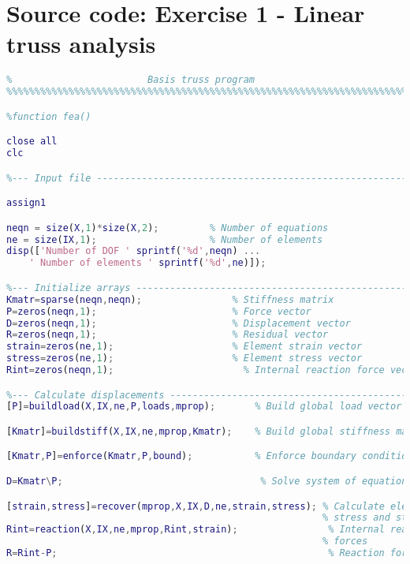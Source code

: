 

\chapter{Source code: Exercise 1 - Linear truss analysis}
\vspace{2mm}
\begin{lstlisting}[language=Matlab, caption = FE implementation for Linear truss analysis, label=lst:CodeLinear]
%%%%%%%%%%%%%%%%%%%%%%%%%%%%%%%%%%%%%%%%%%%%%%%%%%%%%%%%%%%%%%%%%%%%%%%%%%%
%                        Basis truss program                              %
%%%%%%%%%%%%%%%%%%%%%%%%%%%%%%%%%%%%%%%%%%%%%%%%%%%%%%%%%%%%%%%%%%%%%%%%%%%

%function fea()

close all
clc

%--- Input file ----------------------------------------------------------%

assign1

neqn = size(X,1)*size(X,2);         % Number of equations
ne = size(IX,1);                    % Number of elements
disp(['Number of DOF ' sprintf('%d',neqn) ...
    ' Number of elements ' sprintf('%d',ne)]);

%--- Initialize arrays ---------------------------------------------------%
Kmatr=sparse(neqn,neqn);                % Stiffness matrix
P=zeros(neqn,1);                        % Force vector
D=zeros(neqn,1);                        % Displacement vector
R=zeros(neqn,1);                        % Residual vector
strain=zeros(ne,1);                     % Element strain vector
stress=zeros(ne,1);                     % Element stress vector
Rint=zeros(neqn,1);                       % Internal reaction force vector

%--- Calculate displacements ---------------------------------------------%
[P]=buildload(X,IX,ne,P,loads,mprop);       % Build global load vector

[Kmatr]=buildstiff(X,IX,ne,mprop,Kmatr);    % Build global stiffness matrix

[Kmatr,P]=enforce(Kmatr,P,bound);           % Enforce boundary conditions

D=Kmatr\P;                                   % Solve system of equations

[strain,stress]=recover(mprop,X,IX,D,ne,strain,stress); % Calculate element 
                                                        % stress and strain
Rint=reaction(X,IX,ne,mprop,Rint,strain);                % Internal reaction
                                                        % forces
R=Rint-P;                                                % Reaction forces        



\end{lstlisting}
